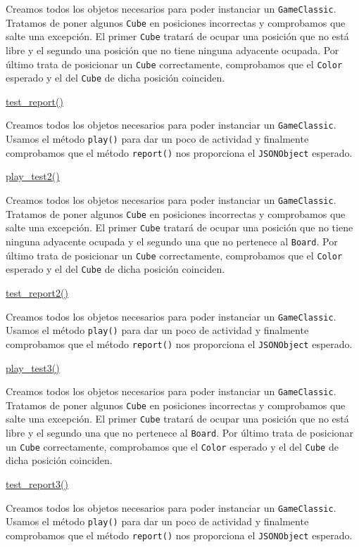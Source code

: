 \documentclass[../DocumentoOficial.tex]{subfiles}
\begin{document}
Creamos todos los objetos necesarios para poder instanciar un \texttt{GameClassic}. Tratamos de poner algunos \texttt{Cube} en posiciones incorrectas y comprobamos que salte una excepción. El primer \texttt{Cube} tratará de ocupar una posición que no está libre y el segundo una posición que no tiene ninguna adyacente ocupada. Por último trata de posicionar un \texttt{Cube} correctamente, comprobamos que el \texttt{Color} esperado y el del \texttt{Cube} de dicha posición coinciden.

\underline{test\_report()}

Creamos todos los objetos necesarios para poder instanciar un \texttt{GameClassic}. Usamos el método \texttt{play()} para dar un poco de actividad y finalmente comprobamos que el método \texttt{report()} nos proporciona el \texttt{JSONObject} esperado.

\underline{play\_test2()}

Creamos todos los objetos necesarios para poder instanciar un \texttt{GameClassic}. Tratamos de poner algunos \texttt{Cube} en posiciones incorrectas y comprobamos que salte una excepción. El primer \texttt{Cube} tratará de ocupar una posición que no tiene ninguna adyacente ocupada y el segundo una que no pertenece al \texttt{Board}. Por último trata de posicionar un \texttt{Cube} correctamente, comprobamos que el \texttt{Color} esperado y el del \texttt{Cube} de dicha posición coinciden.

\underline{test\_report2()}

Creamos todos los objetos necesarios para poder instanciar un \texttt{GameClassic}. Usamos el método \texttt{play()} para dar un poco de actividad y finalmente comprobamos que el método \texttt{report()} nos proporciona el \texttt{JSONObject} esperado.

\underline{play\_test3()}

Creamos todos los objetos necesarios para poder instanciar un \texttt{GameClassic}. Tratamos de poner algunos \texttt{Cube} en posiciones incorrectas y comprobamos que salte una excepción. El primer \texttt{Cube} tratará de ocupar una posición que no está libre y el segundo una que no pertenece al \texttt{Board}. Por último trata de posicionar un \texttt{Cube} correctamente, comprobamos que el \texttt{Color} esperado y el del \texttt{Cube} de dicha posición coinciden.

\underline{test\_report3()}

Creamos todos los objetos necesarios para poder instanciar un \texttt{GameClassic}. Usamos el método \texttt{play()} para dar un poco de actividad y finalmente comprobamos que el método \texttt{report()} nos proporciona el \texttt{JSONObject} esperado.
\end{document}
